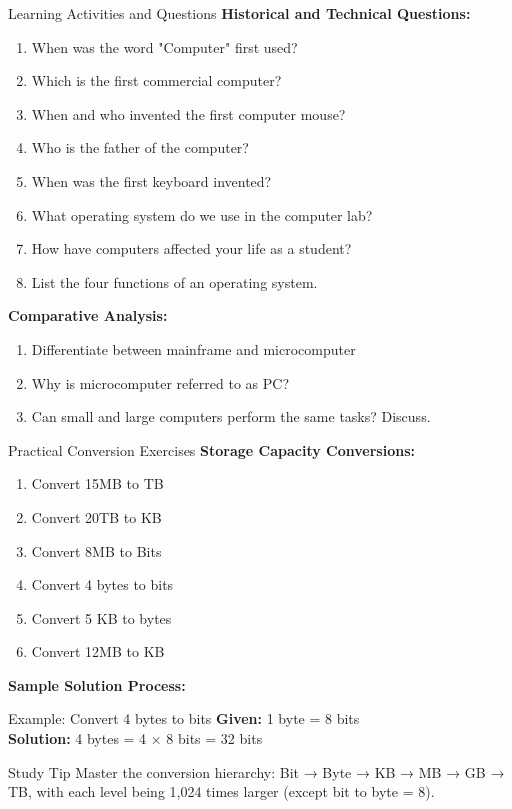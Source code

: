 \documentclass[aspectratio=169]{beamer}
\begin{document}
\begin{frame}{Learning Activities and Questions}
    \textbf{Historical and Technical Questions:}
    
    \begin{enumerate}
        \item When was the word "Computer" first used?
        \item Which is the first commercial computer?
        \item When and who invented the first computer mouse?
        \item Who is the father of the computer?
        \item When was the first keyboard invented?
        \item What operating system do we use in the computer lab?
        \item How have computers affected your life as a student?
        \item List the four functions of an operating system.
    \end{enumerate}
    
    \vspace{0.5cm}
    \textbf{Comparative Analysis:}
    \begin{enumerate}
        \item Differentiate between mainframe and microcomputer
        \item Why is microcomputer referred to as PC?
        \item Can small and large computers perform the same tasks? Discuss.
    \end{enumerate}
\end{frame}

\begin{frame}{Practical Conversion Exercises}
    \textbf{Storage Capacity Conversions:}
    
    \begin{enumerate}
        \item Convert 15MB to TB
        \item Convert 20TB to KB  
        \item Convert 8MB to Bits
        \item Convert 4 bytes to bits
        \item Convert 5 KB to bytes
        \item Convert 12MB to KB
    \end{enumerate}
    
    \vspace{0.5cm}
    \textbf{Sample Solution Process:}
    \begin{exampleblock}{Example: Convert 4 bytes to bits}
        \textbf{Given:} 1 byte = 8 bits
        \\
        \textbf{Solution:} 4 bytes = 4 × 8 bits = 32 bits
    \end{exampleblock}
    
    \begin{alertblock}{Study Tip}
        Master the conversion hierarchy: Bit → Byte → KB → MB → GB → TB, with each level being 1,024 times larger (except bit to byte = 8).
    \end{alertblock}
\end{frame}
\end{document}
